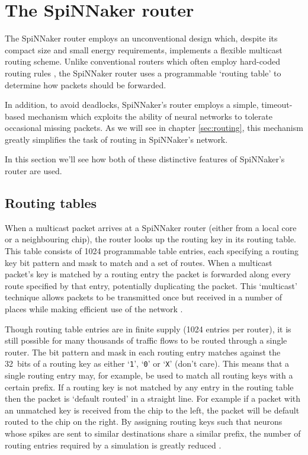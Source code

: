 	\section{The SpiNNaker router}
		
		The SpiNNaker router employs an unconventional design which, despite its
		compact size and small energy requirements, implements a flexible multicast
		routing scheme. Unlike conventional routers which often employ hard-coded
		routing rules \cite[chapter~8]{dally04}, the SpiNNaker router uses a
		programmable `routing table' to determine how packets should be forwarded.
		
		In addition, to avoid deadlocks, SpiNNaker's router employs a simple,
		timeout-based mechanism which exploits the ability of neural networks to
		tolerate occasional missing packets. As we will see in chapter
		\ref{sec:routing}, this mechanism greatly simplifies the task
		of routing in SpiNNaker's network.
		
		In this section we'll see how both of these distinctive features of
		SpiNNaker's router are used.
		
		\subsection{Routing tables}
		
			When a multicast packet arrives at a SpiNNaker router (either from a
			local core or a neighbouring chip), the router looks up the routing key
			in its routing table. This table consists of \num{1024} programmable
			table entries, each specifying a routing key bit pattern and mask to
			match and a set of routes.  When a multicast packet's key is matched by a
			routing entry the packet is forwarded along every route specified by that
			entry, potentially duplicating the packet. This `multicast' technique
			allows packets to be transmitted once but received in a number of places
			while making efficient use of the network \cite{navaridas12}.
			
			Though routing table entries are in finite supply (\num{1024} entries per
			router), it is still possible for many thousands of traffic flows to be
			routed through a single router. The bit pattern and mask in each routing
			entry matches against the 32~bits of a routing key as either
			`\texttt{1}', `\texttt{0}' or `\texttt{X}' (don't care).  This means that
			a single routing entry may, for example, be used to match all routing
			keys with a certain prefix. If a routing key is not matched by any entry
			in the routing table then the packet is `default routed' in a straight
			line. For example if a packet with an unmatched key is received from the
			chip to the left, the packet will be default routed to the chip on the
			right. By assigning routing keys such that neurons whose spikes are sent
			to similar destinations share a similar prefix, the number of routing
			entries required by a simulation is greatly reduced \cite{davies12}.
			
